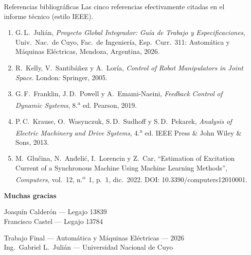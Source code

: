 \documentclass[aspectratio=169,t]{beamer}
\begin{document}
\begin{frame}{Referencias bibliográficas}
{\small\color{uncGray}Las cinco referencias efectivamente citadas en el informe técnico (estilo IEEE).}\par
\vspace{4mm}

\footnotesize
\begin{enumerate}
\item G.\,L.\ Julián, \textit{Proyecto Global Integrador: Guía de Trabajo y Especificaciones}, Univ.\ Nac.\ de Cuyo, Fac.\ de Ingeniería, Esp.\ Curr.\ 311: Automática y Máquinas Eléctricas, Mendoza, Argentina, 2026.

\item R.\ Kelly, V.\ Santibáñez y A.\ Loría, \textit{Control of Robot Manipulators in Joint Space}. London: Springer, 2005.

\item G.\,F.\ Franklin, J.\,D.\ Powell y A.\ Emami-Naeini, \textit{Feedback Control of Dynamic Systems}, 8.\textsuperscript{a} ed. Pearson, 2019.

\item P.\,C.\ Krause, O.\ Wasynczuk, S.\,D.\ Sudhoff y S.\,D.\ Pekarek, \textit{Analysis of Electric Machinery and Drive Systems}, 4.\textsuperscript{a} ed. IEEE Press \& John Wiley \& Sons, 2013.

\item M.\ Glučina, N.\ Anđelić, I.\ Lorencin y Z.\ Car, ``Estimation of Excitation Current of a Synchronous Machine Using Machine Learning Methods'', \textit{Computers}, vol.\ 12, n.\textsuperscript{o}~1, p.\ 1, dic.\ 2022. DOI: 10.3390/computers12010001.
\end{enumerate}
\normalsize
\end{frame}

\begin{frame}[plain]
\vfill\centering
{\Huge\bfseries\color{uncBlue} Muchas gracias\par}
\vspace{8mm}
\vfill
{\small Joaquín Calderón --- Legajo 13839\\Francisco Castel --- Legajo 13784\par}
\vspace{4mm}
{\footnotesize\color{uncGray} Trabajo Final --- Automática y Máquinas Eléctricas --- 2026\\
Ing.\ Gabriel L.\ Julián --- Universidad Nacional de Cuyo}
\vfill
\end{frame}
\end{document}
